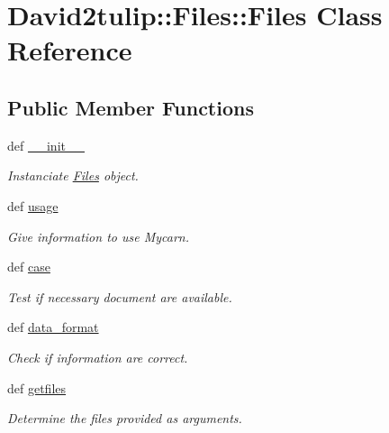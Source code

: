 \hypertarget{classDavid2tulip_1_1Files_1_1Files}{
\section{\-David2tulip\-:\-:\-Files\-:\-:\-Files \-Class \-Reference}
\label{classDavid2tulip_1_1Files_1_1Files}
}
\subsection*{\-Public \-Member \-Functions}
\begin{DoxyCompactItemize}
\item 
\hypertarget{classDavid2tulip_1_1Files_1_1Files_a291479fa06ed7690991b5a4509de6124}{
def \hyperlink{classDavid2tulip_1_1Files_1_1Files_a291479fa06ed7690991b5a4509de6124}{\-\_\-\-\_\-init\-\_\-\-\_\-}}
\label{classDavid2tulip_1_1Files_1_1Files_a291479fa06ed7690991b5a4509de6124}

\begin{DoxyCompactList}\small\item\em \-Instanciate \hyperlink{classDavid2tulip_1_1Files_1_1Files}{\-Files} object. \end{DoxyCompactList}\item 
def \hyperlink{classDavid2tulip_1_1Files_1_1Files_aa430e03312f5cc3d01c622459947327f}{usage}
\begin{DoxyCompactList}\small\item\em \-Give information to use \-Mycarn. \end{DoxyCompactList}\item 
def \hyperlink{classDavid2tulip_1_1Files_1_1Files_affee76dbcc02d78651b9c599f97b7c68}{case}
\begin{DoxyCompactList}\small\item\em \-Test if necessary document are available. \end{DoxyCompactList}\item 
\hypertarget{classDavid2tulip_1_1Files_1_1Files_a74356fae6dc70b537a860dfbea2caa9f}{
def \hyperlink{classDavid2tulip_1_1Files_1_1Files_a74356fae6dc70b537a860dfbea2caa9f}{data\-\_\-format}}
\label{classDavid2tulip_1_1Files_1_1Files_a74356fae6dc70b537a860dfbea2caa9f}

\begin{DoxyCompactList}\small\item\em \-Check if information are correct. \end{DoxyCompactList}\item 
def \hyperlink{classDavid2tulip_1_1Files_1_1Files_a411e73e87a762c3e5e4cada6633be243}{getfiles}
\begin{DoxyCompactList}\small\item\em \-Determine the files provided as arguments. \end{DoxyCompactList}\end{DoxyCompactItemize}
